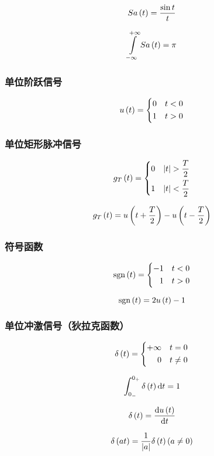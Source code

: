 \documentclass{article}
\begin{document}
\[Sa\left(t\right)=\frac{\sin t}t\]

\[\impint Sa\pare{t}=\pi\]

\subsubsection{单位阶跃信号}

\[u\left(t\right)=
    \left\{\begin{aligned}
        0 &  & t<0 \\
        1 &  & t>0
    \end{aligned}\right.\]

\subsubsection{单位矩形脉冲信号}

\[g_T\pare{t}=
    \left\{\begin{aligned}
        0 &  & \abs{t}>\frac T2 \\
        1 &  & \abs{t}<\frac T2
    \end{aligned}\right.\]

\[g_T\left(t\right)=u\left(t+\frac T2\right)-u\left(t-\frac T2\right)\]

\subsubsection{符号函数}

\[\mathrm{sgn}\left(t\right)=
    \left\{\begin{aligned}
        -1 &  & t<0 \\
        1  &  & t>0
    \end{aligned}\right.\]

\[\mathrm{sgn}\left(t\right)=2u\left(t\right)-1\]

\subsubsection{单位冲激信号（狄拉克函数）}

\[\delta\left(t\right)=
    \left\{\begin{aligned}
        +\infty &  & t=0    \\
        0       &  & t\neq0
    \end{aligned}\right.\]

\[\int_{0_-}^{0_+}\delta\left(t\right)\mathrm d t=1\]

\[\delta\left(t\right)=\frac{\mathrm d u\left(t\right)}{\mathrm d t}\]

\[\delta\left(at\right)=\frac1{\left|a\right|}\delta\left(t\right)\left(a\neq0\right)\]
\end{document}
